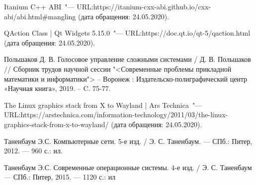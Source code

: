 \begin{thebibliography}{99}
 Itanium C++ ABI~"---
URL:\@ https://itanium-cxx-abi.github.io/cxx-abi/abi.html\allowbreak \#mangling
(дата обращения: 24.05.2020).

 QAction Class | Qt Widgets 5.15.0~"---
URL:\@ https://doc.qt.io/qt-5/qaction.html
(дата обращения: 24.05.2020).

Польшаков Д. В. Голосовое управление сложными системами / Д. В. Польшаков //
Сборник трудов научной сессии
"<Современные проблемы прикладной математики и информатики">
– Воронеж : Издательско-полиграфический
центр «Научная книга», 2019. – C. 75-77.

 The Linux graphics stack from X to Wayland | Ars Technica~"---
URL:\@ https://arstechnica.com/information-technology/2011/03/the-linux-graphics-stack-from-x-to-wayland/
(дата обращения: 24.05.2020).

 Таненбаум Э.С. Компьютерные сети. 5-е изд. / Э. С. Таненбаум. — СПб.: Питер, 2012. — 960 с.: ил.

 Таненбаум Э.С. Современные операционные системы. 4-е изд. / Э. С. Таненбаум — СПб.: Питер, 2015. — 1120 с.: ил

\end{thebibliography}
